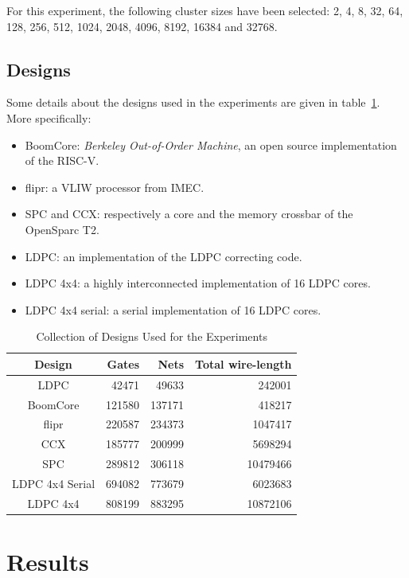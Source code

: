 \documentclass[conference]{IEEEtran}
\begin{document}
For this experiment, the following cluster sizes have been selected: 2, 4, 8, 32, 64, 128, 256, 512, 1024, 2048, 4096, 8192, 16384 and 32768.

\subsection{Designs}
Some details about the designs used in the experiments are given in table~\ref{tab:designs}.
More specifically:
\begin{itemize}
    \item BoomCore: \textit{Berkeley Out-of-Order Machine}, an open source implementation of the RISC-V.
    \item flipr: a VLIW processor from IMEC.
    \item SPC and CCX: respectively a core and the memory crossbar of the OpenSparc T2.
    \item LDPC: an implementation of the LDPC correcting code.
    \item LDPC 4x4: a highly interconnected implementation of 16 LDPC cores.
    \item LDPC 4x4 serial: a serial implementation of 16 LDPC cores.
\end{itemize}


\begin{table}[!t]
\renewcommand{\arraystretch}{1.3}
\caption{Collection of Designs Used for the Experiments}
\label{tab:designs}
\centering
\begin{tabular}{||c|r|r|r||}
\hline
Design & Gates & Nets & Total wire-length\\
\hline
\hline
LDPC & 42471 & 49633 & 242001\\
\hline
BoomCore & 121580 & 137171 & 418217\\
\hline
flipr & 220587 & 234373 & 1047417 \\
\hline
CCX & 185777 & 200999 & 5698294\\
\hline
SPC & 289812 & 306118 & 10479466\\
\hline
LDPC 4x4 Serial & 694082 & 773679 & 6023683\\
\hline
LDPC 4x4 & 808199 & 883295 & 10872106\\
\hline
\end{tabular}
\end{table}


\newpage
\section{Results}\label{sec:res}
\end{document}
